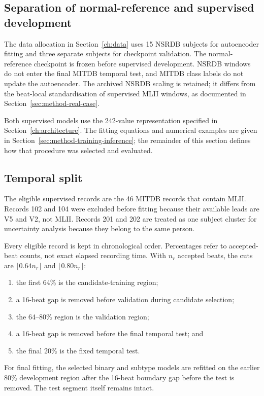 \subsection{Separation of normal-reference and supervised development}

The data allocation in Section~\ref{ch:data} uses 15 NSRDB subjects for
autoencoder fitting and three separate subjects for checkpoint validation.
The normal-reference checkpoint is frozen before supervised development.
NSRDB windows do not enter the final MITDB temporal test, and MITDB class
labels do not update the autoencoder. The archived NSRDB scaling is retained;
it differs from the beat-local standardisation of supervised MLII windows,
as documented in Section~\ref{sec:method-real-case}.

Both supervised models use the 242-value representation specified in
Section~\ref{ch:architecture}. The fitting equations and numerical examples
are given in Section~\ref{sec:method-training-inference}; the remainder of
this section defines how that procedure was selected and evaluated.

\subsection{Temporal split}

The eligible supervised records are the 46 MITDB records that contain MLII.
Records 102 and 104 were excluded before fitting because their available leads
are V5 and V2, not MLII. Records 201 and 202 are treated as one subject cluster
for uncertainty analysis because they belong to the same person.

Every eligible record is kept in chronological order. Percentages refer to
accepted-beat counts, not exact elapsed recording time. With $n_r$ accepted
beats, the cuts are $\lfloor0.64n_r\rfloor$ and $\lfloor0.80n_r\rfloor$:
\begin{enumerate}
    \item the first 64\% is the candidate-training region;
    \item a 16-beat gap is removed before validation during candidate
    selection;
    \item the 64--80\% region is the validation region;
    \item a 16-beat gap is removed before the final temporal test; and
    \item the final 20\% is the fixed temporal test.
\end{enumerate}
For final fitting, the selected binary and subtype models are refitted on the
earlier 80\% development region after the 16-beat boundary gap before the test
is removed. The test segment itself remains intact.

